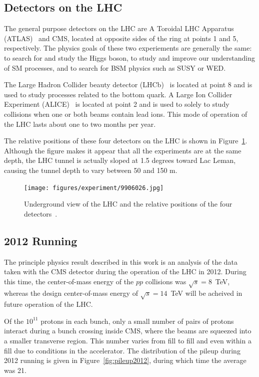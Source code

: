 \subsection{Detectors on the LHC\label{subsec:detectors}}

The general purpose detectors on the LHC are A Toroidal LHC Apparatus (ATLAS)~\cite{cern-jinst-atlas}
and CMS, located at opposite sides of the ring at points 1 and 5, respectively. The physics
goals of these two experiements are generally the same: to search for and study the Higgs boson,
to study and improve our understanding of SM processes, and to search for BSM physics such as
SUSY or WED.

The Large Hadron Collider beauty detector (LHCb)~\cite{cern-jinst-lhcb}
is located at point 8 and is used
to study processes related to the bottom quark. A Large Ion Collider Experiment
(ALICE)~\cite{cern-jinst-alice} is located
at point 2 and is used to solely to study collisions when one or both beams contain lead ions. This
mode of operation of the LHC lasts about one to two months per year.

The relative positions of these four detectors on the LHC is shown in Figure~\ref{fig:lhc_detectors}.
Although the figure makes it appear that all the experiments are at the same depth, the LHC tunnel is
actually sloped at 1.5 degrees toward Lac Leman, causing the tunnel depth to vary between 50 and 150 m.

\begin{figure}[ht]
 \begin{center}
    \texttt{[image: figures/experiment/9906026.jpg]}
      \end{center}
\caption{Underground view of the LHC and the relative positions of the four detectors~\cite{Dailler:842399}.}
\label{fig:lhc_detectors}
\end{figure}

\subsection{2012 Running}

The principle physics result described in this work is an analysis of the data taken with the
CMS detector during the operation of the LHC in 2012. During this time, the center-of-mass energy
of the $pp$ collisions was $\sqrt{s} = 8$~TeV, whereas the design center-of-mass energy of
$\sqrt{s} = 14$~TeV will be acheived in future operation of the LHC. 

Of the $10^{11}$ protons in each bunch, only a small number of pairs of protons interact during
a bunch crossing inside CMS, where the beams are squeezed into a smaller transverse region. This number
varies from fill to fill and even within a fill due to conditions in the accelerator. The distribution
of the pileup during 2012 running is given in Figure~\ref{fig:pileup2012}, during which time the
average was 21.

